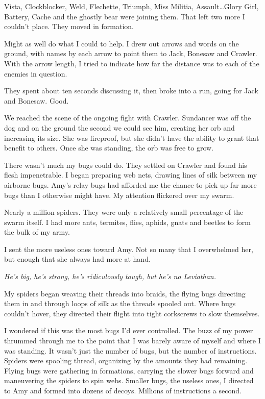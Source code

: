 Vista, Clockblocker, Weld, Flechette, Triumph, Miss Militia, Assault\ldots Glory Girl, Battery, Cache and the ghostly bear were joining them.  That left two more I couldn't place.  They moved in formation.



Might as well do what I could to help.  I drew out arrows and words on the ground, with names by each arrow to point them to Jack, Bonesaw and Crawler.  With the arrow length, I tried to indicate how far the distance was to each of the enemies in question.



They spent about ten seconds discussing it, then broke into a run, going for Jack and Bonesaw.  Good.



We reached the scene of the ongoing fight with Crawler.  Sundancer was off the dog and on the ground the second we could see him, creating her orb and increasing its size.  She was fireproof, but she didn't have the ability to grant that benefit to others.  Once she was standing, the orb was free to grow.



There wasn't much my bugs could do.  They settled on Crawler and found his flesh impenetrable.  I began preparing web nets, drawing lines of silk between my airborne bugs.  Amy's relay bugs had afforded me the chance to pick up far more bugs than I otherwise might have.  My attention flickered over my swarm.



Nearly a million spiders.  They were only a relatively small percentage of the swarm itself.  I had more ants, termites, flies, aphids, gnats and beetles to form the bulk of my army.



I sent the more useless ones toward Amy.  Not so many that I overwhelmed her, but enough that she always had more at hand.



\emph{He's big, he's strong, he's ridiculously tough, but he's no Leviathan.}



My spiders began weaving their threads into braids, the flying bugs directing them in and through loops of silk as the threads spooled out.  Where bugs couldn't hover, they directed their flight into tight corkscrews to slow themselves.



I wondered if this was the most bugs I'd ever controlled.  The buzz of my power thrummed through me to the point that I was barely aware of myself and where I was standing.  It wasn't just the number of  bugs, but the number of instructions.  Spiders were spooling thread, organizing by the amounts they had remaining.  Flying bugs were gathering in formations, carrying the slower bugs forward and maneuvering the spiders to spin webs.  Smaller bugs, the useless ones, I directed to Amy and formed into dozens of decoys.  Millions of instructions a second.



